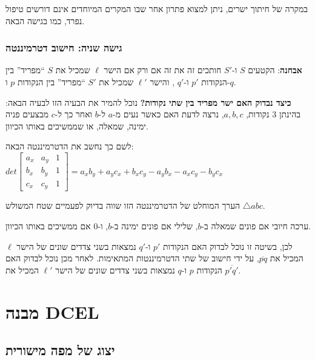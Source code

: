 \documentclass[
]{book}
\begin{document}
במקרה של חיתוך ישרים, ניתן למצוא פתרון אחר שבו המקרים המיוחדים אינם
דורשים טיפול נפרד, כמו בגישה הבאה.

\hypertarget{ux5d2ux5d9ux5e9ux5d4-ux5e9ux5e0ux5d9ux5d4-ux5d7ux5d9ux5e9ux5d5ux5d1-ux5d3ux5d8ux5e8ux5deux5d9ux5e0ux5e0ux5d8ux5d4}{%
\subsubsection*{גישה שניה: חישוב דטרמיננטה}\label{ux5d2ux5d9ux5e9ux5d4-ux5e9ux5e0ux5d9ux5d4-ux5d7ux5d9ux5e9ux5d5ux5d1-ux5d3ux5d8ux5e8ux5deux5d9ux5e0ux5e0ux5d8ux5d4}}

\textbf{אבחנה}:
הקטעים \(S\) ו-\(S'\) חותכים זה את זה אם ורק אם הישר \(\ell\) שמכיל את \(S\)
``מפריד'' בין הנקודות \(p'\) ו-\(q'\) , והישר \(\ell'\) שמכיל את \(S'\) ``מפריד''
בין הנקודות \(p\) ו-\(q\).

\textbf{כיצד נבדוק האם ישר מפריד בין שתי נקודות?} נוכל להמיר את הבעיה הזו
לבעיה הבאה: בהינתן 3 נקודות, \(a,b,c\), נרצה לדעת האם כאשר נעים מ-\(a\)
ל-\(b\) ואחר כך ל-\(c\) מבצעים פניה ימינה, שמאלה, או שממשיכים באותו הכיוון.

לשם כך נחשב את הדטרמיננטה הבאה:
\(det\begin{bmatrix}a_x&a_y&1\\b_x&b_y&1\\c_x&c_y&1\end{bmatrix}=a_xb_y+a_yc_x+b_xc_y-a_yb_x-a_xc_y-b_yc_x\)

הערך המוחלט של הדטרמיננטה הזו שווה בדיוק לפעמיים שטח המשולש
\(\triangle a b c\).

ערכה חיובי אם פונים שמאלה ב-\(b\), שלילי אם פונים ימינה ב-\(b\), ו-0 אם
ממשיכים באותו הכיוון.

לכן, בשיטה זו
נוכל לבדוק האם הנקודות \(p'\) ו-\(q'\) נמצאות בשני צדדים שונים של הישר
\(\ell\) המכיל את \(\overline{pq}\), על ידי חישוב של שתי הדטרמיננטות
המתאימות. לאחר מכן נוכל לבדוק האם הנקודות \(p\) ו-\(q\) נמצאות בשני צדדים
שונים של הישר \(\ell'\) המכיל את \(\overline{p'q'}\).

\hypertarget{dcel}{%
\section{מבנה DCEL}\label{dcel}}

\hypertarget{plan-map}{%
\subsection{יצוג של מפה מישורית}\label{plan-map}}
\end{document}
